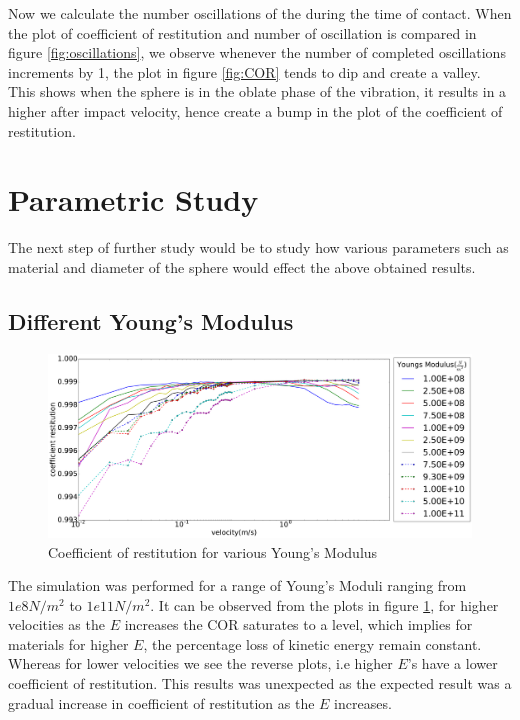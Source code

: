 Now we calculate the number oscillations of the during the time of contact. When the plot of coefficient of restitution and number of oscillation is compared in figure \ref{fig:oscillations}, we observe whenever the number of completed oscillations increments by 1, the plot in figure \ref{fig:COR} tends to dip and create a valley. This shows when the sphere is in the oblate phase of the vibration, it results in a higher after impact velocity, hence create a bump in the plot of the coefficient of restitution.




\section{Parametric Study}

The next step of further study would be to study how various parameters such as material and diameter of the sphere would effect the above obtained results.


\subsection{Different Young's Modulus}

\begin{figure}[H]
\includegraphics[width=1.0\textwidth]{../images/parametricStudy/CORdiffE_pdf.pdf}
\caption{Coefficient of restitution for various Young's Modulus}
\label{fig:CORdiffEcomplete}
\end{figure}

The simulation was performed for a range of Young's Moduli ranging from $1e8N/m^{2}$ to $1e11N/m^{2}$. It can be observed from the plots in figure \ref{fig:CORdiffEcomplete}, for higher velocities as the $E$ increases the COR saturates to a level, which implies for materials for higher $E$, the percentage loss of kinetic energy remain constant. Whereas for lower velocities we see the reverse plots, i.e higher $E$'s have a lower coefficient of restitution. This results was unexpected as the expected result was a gradual increase in coefficient of restitution as the $E$ increases. 

